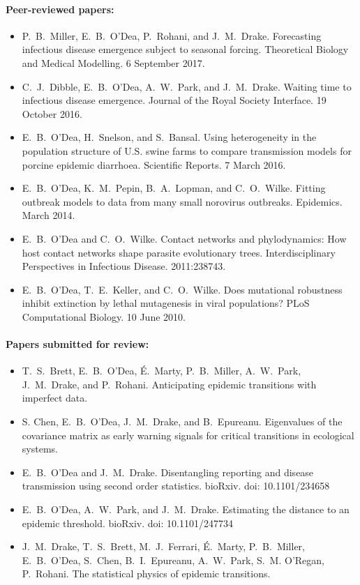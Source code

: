 \documentclass[a4paper]{article}
\begin{document}
\paragraph{Peer-reviewed papers:}
\begin{itemize}
  \item[~] P.\ B.\ Miller, E.\ B.\ O'Dea, P.\ Rohani, and
    J.\ M.\ Drake. Forecasting infectious disease emergence subject to
    seasonal forcing. Theoretical Biology and Medical Modelling. 6
    September 2017.
  \item[~] C.\ J.\ Dibble, E.\ B.\ O'Dea, A.\ W.\ Park, and
    J.\ M.\ Drake. Waiting time to infectious disease
    emergence. Journal of the Royal Society Interface. 19 October 2016.
  \item[~] E.\ B.\ O'Dea, H.\ Snelson, and S.\ Bansal. Using
    heterogeneity in the population structure of U.S. swine farms to
    compare transmission models for porcine epidemic
    diarrhoea. Scientific Reports. 7 March 2016.
  \item[~] E.\ B.\ O'Dea, K.\ M.\ Pepin, B.\ A.\ Lopman, and
    C.\ O.\ Wilke. Fitting outbreak models to data from many small
    norovirus outbreaks. Epidemics. March 2014.
  \item[~] E.\ B.\ O'Dea and C.\ O.\ Wilke. Contact networks and
    phylodynamics: How host contact networks shape parasite
    evolutionary trees. Interdisciplinary Perspectives in Infectious
    Disease. 2011:238743.
  \item[~] E.\ B.\ O'Dea, T.\ E.\ Keller, and C.\ O.\ Wilke. Does
    mutational robustness inhibit extinction by lethal mutagenesis in
    viral populations? PLoS Computational Biology. 10 June 2010.
\end{itemize}

\paragraph{Papers submitted for review:}
\begin{itemize}
  \item[~] T.\ S.\ Brett, E.\ B.\ O'Dea, \'{E}.\ Marty,
    P.\ B.\ Miller, A.\ W.\ Park, J.\ M.\ Drake, and
    P.\ Rohani. Anticipating epidemic transitions with imperfect
    data.
  \item[~] S. Chen, E.\ B.\ O'Dea, J.\ M.\ Drake, and
    B.\ Epureanu. Eigenvalues of the covariance matrix as early
    warning signals for critical transitions in ecological systems.
  \item[~] E.\ B.\ O'Dea and J.\ M.\ Drake.  Disentangling reporting and disease transmission using second order statistics. bioRxiv. doi: 10.1101/234658
  \item[~] E.\ B.\ O'Dea, A.\ W.\ Park, and J.\ M.\ Drake.  Estimating the distance to an epidemic threshold. bioRxiv. doi: 10.1101/247734
  \item[~] J.\ M.\ Drake, T.\ S.\ Brett, M.\ J.\ Ferrari,
    \'{E}.\ Marty, P.\ B.\ Miller, E.\ B.\ O'Dea, S.\ Chen,
    B.\ I.\ Epureanu, A.\ W.\ Park, S.\ M. O'Regan, P.\ Rohani. The
    statistical physics of epidemic transitions.
\end{itemize}
\end{document}
